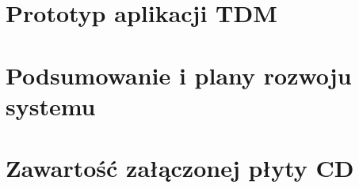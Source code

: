 \documentclass[12pt,oneside]{memoir}
\begin{document}
	\chapter{Prototyp aplikacji TDM }
	
	
	\chapter{Podsumowanie i plany rozwoju systemu}
		

	
    \label{biblio}
    
    
    \newpage
    \addtolength\cftfigurenumwidth{1em} %
    \listoffigures
	\newpage
	\addtolength\cfttablenumwidth{1em}
	\listoftables	

    \label{Dodatki}
    \newpage
    \appendix
    \renewcommand{\appendixtocname}{Dodatki}
    \renewcommand{\appendixpagename}{~\begin{center}Dodatki\end{center}\newpage}
    \thispagestyle{empty}
    \addappheadtotoc
	\chapter{Zawartość załączonej płyty CD}
	
	
\begin{comment}
	\listoftodos
\end{comment}
    
\end{document}
